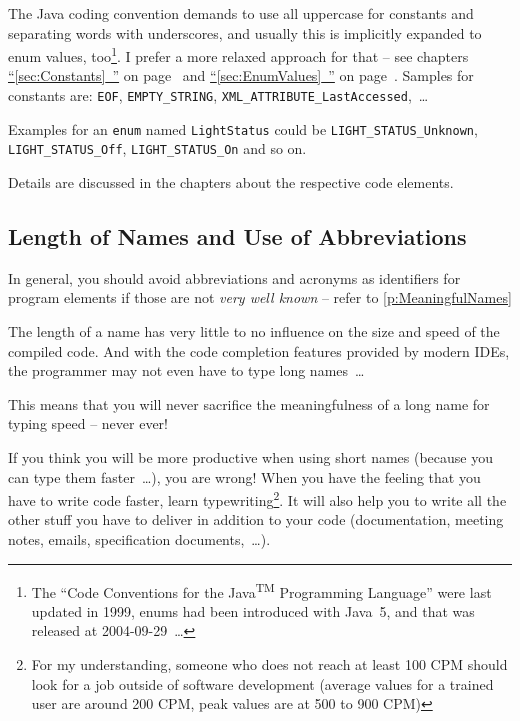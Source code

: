 \documentclass[11pt,a4paper, titlepage, parskip=half, headsepline, footsepline, cleardoublepage=current, headheight=1cm]{scrbook}
\newcommand*{\tqfullvref}[1]{\hyperref[{#1}]{“\ref*{#1}~\nameref*{#1}”} on page~\pageref{#1}}
\begin{document}
The Java coding convention \autocite{SUN_CODE_CONVENTIONS} demands to use all uppercase for constants and separating words with underscores, and usually this is implicitly expanded to enum values, too\footnote{The “Code Conventions for the Java\textsuperscript{TM} Programming Language” \autocite{SUN_CODE_CONVENTIONS} were last updated in 1999, enums had been introduced with Java~5, and that was released at 2004-09-29~…}. I prefer a more relaxed approach for that – see chapters \tqfullvref{sec:Constants} and \tqfullvref{sec:EnumValues}. Samples for constants are: \lstinline|EOF|, \lstinline|EMPTY_STRING|, \lstinline|XML_ATTRIBUTE_LastAccessed|,~…

Examples for an \lstinline|enum| named \lstinline|LightStatus| could be \lstinline|LIGHT_STATUS_Unknown|, \lstinline|LIGHT_STATUS_Off|, \lstinline|LIGHT_STATUS_On| and so on.

Details are discussed in the chapters about the respective code elements.


\subsection{Length of Names and Use of Abbreviations}\label{sec:LengthOfNamesAndUseOfAbbreviations}
In general, you should avoid abbreviations and acronyms as identifiers for program elements if those are not \textit{very well known} – refer to \ref{p:MeaningfulNames}

The length of a name has very little to no influence on the size and speed of the compiled code. And with the code completion features provided by modern IDEs, the programmer may not even have to type long names~…

This means that you will never sacrifice the meaningfulness of a long name for typing speed – never ever!

If you think you will be more productive when using short names (because you can type them faster~…), you are wrong! When you have the feeling that you have to write code faster, learn typewriting\footnote{For my understanding, someone who does not reach at least 100 CPM should look for a job outside of software development (average values for a trained user are around 200 CPM, peak values are at 500 to 900 CPM)}. It will also help you to write all the other stuff you have to deliver in addition to your code (documentation, meeting notes, emails, specification documents,~…).
\end{document}
